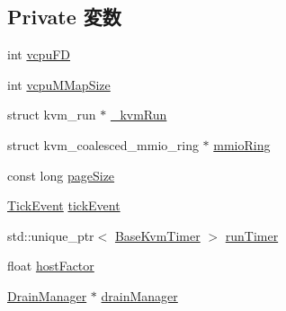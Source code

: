 \subsection*{Private 変数}
\begin{DoxyCompactItemize}
\item 
int \hyperlink{classBaseKvmCPU_a6b91f8b5649b80e8424cebfa3047e1d0}{vcpuFD}
\item 
int \hyperlink{classBaseKvmCPU_a0915679bdc25b2c015f15996f6d4ff6d}{vcpuMMapSize}
\item 
struct kvm\_\-run $\ast$ \hyperlink{classBaseKvmCPU_ab174cc060c981cfd21406dc3797c8c6b}{\_\-kvmRun}
\item 
struct kvm\_\-coalesced\_\-mmio\_\-ring $\ast$ \hyperlink{classBaseKvmCPU_ad4e1bcd3f032d2921aa97aec1fc7a45c}{mmioRing}
\item 
const long \hyperlink{classBaseKvmCPU_a8386a4766759aabc32038300820a64aa}{pageSize}
\item 
\hyperlink{structBaseKvmCPU_1_1TickEvent}{TickEvent} \hyperlink{classBaseKvmCPU_aa36b8e894416f0ec98f701ab08f2ac22}{tickEvent}
\item 
std::unique\_\-ptr$<$ \hyperlink{classBaseKvmTimer}{BaseKvmTimer} $>$ \hyperlink{classBaseKvmCPU_a28c546a9aa908313559ed074632a0c37}{runTimer}
\item 
float \hyperlink{classBaseKvmCPU_a0ef366aa4bbbcdc2f7eeb7fcd3962dde}{hostFactor}
\item 
\hyperlink{classDrainManager}{DrainManager} $\ast$ \hyperlink{classBaseKvmCPU_a329b71fb934a93312ca0aacbf5a3f982}{drainManager}
\end{DoxyCompactItemize}
\label{_amgrpd41d8cd98f00b204e9800998ecf8427e}
